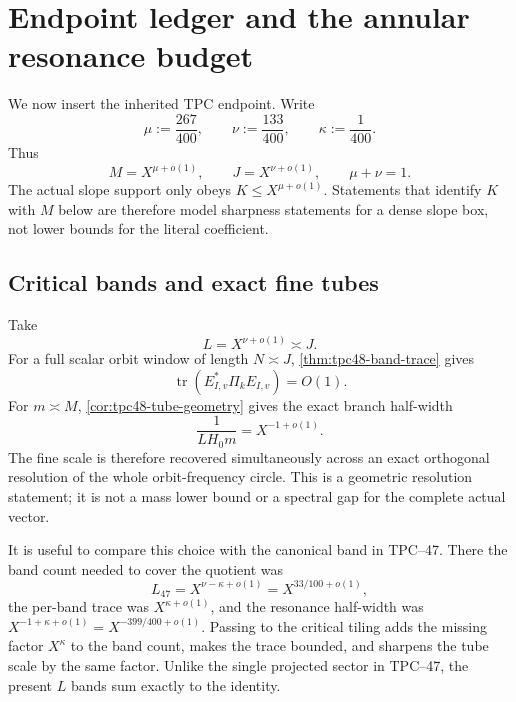 \section{Endpoint ledger and the annular resonance budget}
\label{sec:tpc48-endpoint}

We now insert the inherited TPC endpoint.  Write
\begin{equation}
 \mu:=\frac{267}{400},
 \qquad
 \nu:=\frac{133}{400},
 \qquad
 \kappa:=\frac1{400}.
 \label{eq:tpc48-endpoint-exponents}
\end{equation}
Thus
\begin{equation}
 M=X^{\mu+o(1)},
 \qquad
 J=X^{\nu+o(1)},
 \qquad
 \mu+\nu=1.
 \label{eq:tpc48-endpoint-scales}
\end{equation}
The actual slope support only obeys \(K\le X^{\mu+o(1)}\).  Statements
that identify \(K\) with \(M\) below are therefore model sharpness
statements for a dense slope box, not lower bounds for the literal
coefficient.

\subsection{Critical bands and exact fine tubes}

Take
\begin{equation}
 L=X^{\nu+o(1)}\asymp J.
 \label{eq:tpc48-critical-band-count}
\end{equation}
For a full scalar orbit window of length \(N\asymp J\),
\cref{thm:tpc48-band-trace} gives
\begin{equation}
 \operatorname{tr}(E_{I,v}^*\Pi_kE_{I,v})=O(1).
 \label{eq:tpc48-critical-trace}
\end{equation}
For \(m\asymp M\), \cref{cor:tpc48-tube-geometry} gives the exact
branch half-width
\begin{equation}
 \frac1{LH_0m}=X^{-1+o(1)}.
 \label{eq:tpc48-endpoint-tube-width}
\end{equation}
The fine scale is therefore recovered simultaneously across an exact
orthogonal resolution of the whole orbit-frequency circle.  This is a
geometric resolution statement; it is not a mass lower bound or a
spectral gap for the complete actual vector.

It is useful to compare this choice with the canonical band in
TPC--47.  There the band count needed to cover the quotient was
\begin{equation}
 L_{47}=X^{\nu-\kappa+o(1)}=X^{33/100+o(1)},
 \label{eq:tpc48-tpc47-cover-count}
\end{equation}
the per-band trace was \(X^{\kappa+o(1)}\), and the resonance
half-width was \(X^{-1+\kappa+o(1)}=X^{-399/400+o(1)}\).
Passing to the critical tiling adds the missing factor \(X^\kappa\)
to the band count, makes the trace bounded, and sharpens the tube
scale by the same factor.  Unlike the single projected sector in
TPC--47, the present \(L\) bands sum exactly to the identity.


